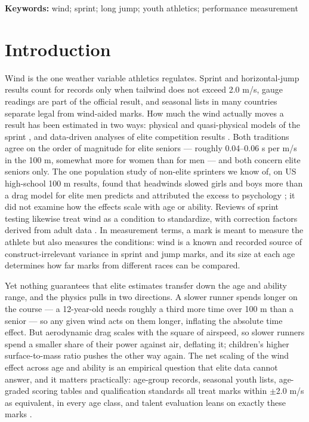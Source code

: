 \documentclass[12pt,a4paper]{article}
\begin{document}
\textbf{Keywords:} wind; sprint; long jump; youth athletics; performance measurement

\newpage

\section{Introduction}

Wind is the one weather variable athletics regulates. Sprint and horizontal-jump results count for records only when tailwind does not exceed 2.0 m/s, gauge readings are part of the official result, and seasonal lists in many countries separate legal from wind-aided marks. How much the wind actually moves a result has been estimated in two ways: physical and quasi-physical models of the sprint \citep{linthorne1994,mureika2001}, and data-driven analyses of elite competition results \citep{moinat2018,hollings2012}. Both traditions agree on the order of magnitude for elite seniors --- roughly 0.04--0.06 s per m/s in the 100 m, somewhat more for women than for men --- and both concern elite seniors only. The one population study of non-elite sprinters we know of, on US high-school 100 m results, found that headwinds slowed girls and boys more than a drag model for elite men predicts and attributed the excess to psychology \citep{lybbert2023}; it did not examine how the effects scale with age or ability. Reviews of sprint testing likewise treat wind as a condition to standardize, with correction factors derived from adult data \citep{haugen2016}. In measurement terms, a mark is meant to measure the athlete but also measures the conditions: wind is a known and recorded source of construct-irrelevant variance in sprint and jump marks, and its size at each age determines how far marks from different races can be compared.

Yet nothing guarantees that elite estimates transfer down the age and ability range, and the physics pulls in two directions. A slower runner spends longer on the course --- a 12-year-old needs roughly a third more time over 100 m than a senior --- so any given wind acts on them longer, inflating the absolute time effect. But aerodynamic drag scales with the square of airspeed, so slower runners spend a smaller share of their power against air, deflating it; children's higher surface-to-mass ratio pushes the other way again. The net scaling of the wind effect across age and ability is an empirical question that elite data cannot answer, and it matters practically: age-group records, seasonal youth lists, age-graded scoring tables and qualification standards all treat marks within $\pm$2.0 m/s as equivalent, in every age class, and talent evaluation leans on exactly these marks \citep{guttormsen2026development}.
\end{document}
